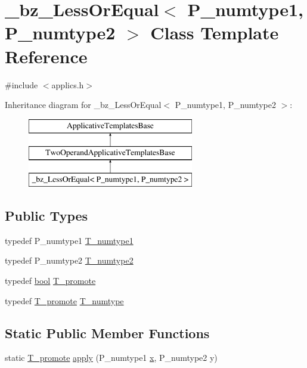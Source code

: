 \hypertarget{class__bz__LessOrEqual}{}\section{\+\_\+bz\+\_\+\+Less\+Or\+Equal$<$ P\+\_\+numtype1, P\+\_\+numtype2 $>$ Class Template Reference}
\label{class__bz__LessOrEqual}


{\ttfamily \#include $<$applics.\+h$>$}

Inheritance diagram for \+\_\+bz\+\_\+\+Less\+Or\+Equal$<$ P\+\_\+numtype1, P\+\_\+numtype2 $>$\+:\begin{figure}[H]
\begin{center}
\leavevmode
\includegraphics[height=3.000000cm]{class__bz__LessOrEqual}
\end{center}
\end{figure}
\subsection*{Public Types}
\begin{DoxyCompactItemize}
\item 
typedef P\+\_\+numtype1 \hyperlink{class__bz__LessOrEqual_ab7d366bc9b6d6de1a4ea5562470ca821}{T\+\_\+numtype1}
\item 
typedef P\+\_\+numtype2 \hyperlink{class__bz__LessOrEqual_ac67f5a49135121a7ee9aebf2d2fc7c26}{T\+\_\+numtype2}
\item 
typedef \hyperlink{compiler_8h_abb452686968e48b67397da5f97445f5b}{bool} \hyperlink{class__bz__LessOrEqual_af5192608c2dfc73d014324e6e1c9b313}{T\+\_\+promote}
\item 
typedef \hyperlink{class__bz__LessOrEqual_af5192608c2dfc73d014324e6e1c9b313}{T\+\_\+promote} \hyperlink{class__bz__LessOrEqual_a1894ea38a7ceb298ee1f0ea82281ea19}{T\+\_\+numtype}
\end{DoxyCompactItemize}
\subsection*{Static Public Member Functions}
\begin{DoxyCompactItemize}
\item 
static \hyperlink{class__bz__LessOrEqual_af5192608c2dfc73d014324e6e1c9b313}{T\+\_\+promote} \hyperlink{class__bz__LessOrEqual_a4ba5104bdfe72cf71d35f29b676cf11a}{apply} (P\+\_\+numtype1 \hyperlink{vecnorm1_8cc_ac73eed9e41ec09d58f112f06c2d6cb63}{x}, P\+\_\+numtype2 y)
\end{DoxyCompactItemize}


